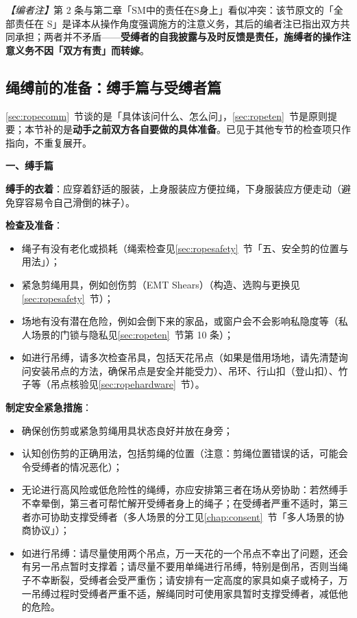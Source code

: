 \documentclass[12pt,UTF8]{ctexbook}
\begin{document}
\noindent\textit{【编者注】}第 2 条与第二章「SM中的责任在S身上」看似冲突：该节原文的「全部责任在 S」是译本从操作角度强调施方的注意义务，其后的编者注已指出双方共同承担；两者并不矛盾——\textbf{受缚者的自我披露与及时反馈是责任，施缚者的操作注意义务不因「双方有责」而转嫁}。

\subsection{绳缚前的准备：缚手篇与受缚者篇}\label{sec:ropeprep}

\ref{sec:ropecomm}~节谈的是「具体该问什么、怎么问」，\ref{sec:ropeten}~节是原则提要；本节补的是\textbf{动手之前双方各自要做的具体准备}。已见于其他专节的检查项只作指向，不重复展开。

\noindent\textbf{一、缚手篇}

\textbf{缚手的衣着}：应穿着舒适的服装，上身服装应方便拉绳，下身服装应方便走动（避免穿容易令自己滑倒的袜子）。

\textbf{检查及准备}：
\begin{itemize}
\item 绳子有没有老化或损耗（绳索检查见\ref{sec:ropesafety}~节「五、安全剪的位置与用法」）；
\item 紧急剪绳用具，例如创伤剪（EMT Shears）（构造、选购与更换见\ref{sec:ropesafety}~节）；
\item 场地有没有潜在危险，例如会倒下来的家品，或窗户会不会影响私隐度等（私人场景的门锁与隐私见\ref{sec:ropeten}~节第 10 条）；
\item 如进行吊缚，请多次检查吊具，包括天花吊点（如果是借用场地，请先清楚询问安装吊点的方法，确保吊点是安全并能受力）、吊环、行山扣（登山扣）、竹子等（吊点核验见\ref{sec:ropehardware}~节）。
\end{itemize}

\textbf{制定安全紧急措施}：
\begin{itemize}
\item 确保创伤剪或紧急剪绳用具状态良好并放在身旁；
\item 认知创伤剪的正确用法，包括剪绳的位置（注意：剪绳位置错误的话，可能会令受缚者的情况恶化）；
\item 无论进行高风险或低危险性的绳缚，亦应安排第三者在场从旁协助：若然缚手不幸晕倒，第三者可帮忙解开受缚者身上的绳子；在受缚者严重不适时，第三者亦可协助支撑受缚者（多人场景的分工见\ref{chap:consent}~节「多人场景的协商协议」）；
\item 如进行吊缚：请尽量使用两个吊点，万一天花的一个吊点不幸出了问题，还会有另一吊点暂时支撑着；请尽量不要用单绳进行吊缚，特别是倒吊，否则当绳子不幸断裂，受缚者会受严重伤；请安排有一定高度的家具如桌子或椅子，万一吊缚过程时受缚者严重不适，解绳同时可使用家具暂时支撑受缚者，减低他的危险。
\end{itemize}
\end{document}
